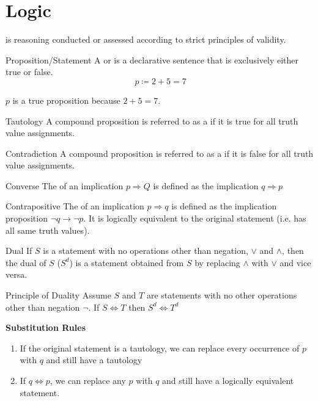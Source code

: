 \documentclass[12pt]{report}
\begin{document}
\newpage
\chapter{Logic}
 is reasoning conducted or assessed according to strict principles of validity.

\begin{dfnbox}{Proposition/Statement}
	A  or  is a declarative sentence that is exclusively either true or false.
	$$\ p \coloneq 2+5=7 $$
	
	$p$ is a true proposition because $2+5=7$.
\end{dfnbox}

\begin{dfnbox}{Tautology}
	A compound proposition is referred to as a  if it is true for all truth value assignments.
\end{dfnbox}

\begin{dfnbox}{Contradiction}
	A compound proposition is referred to as a  if it is false for all truth value assignments.
\end{dfnbox}

\begin{dfnbox}{Converse}
	The  of an implication $p \Rightarrow Q$ is defined as the implication $q \Rightarrow p$
\end{dfnbox}

\begin{dfnbox}{Contrapositive}
	The  of an implication $p \Rightarrow q$ is defined as the implication proposition $\neg q \rightarrow \neg p$. It is logically equivalent to the original statement (i.e. has all same truth values).
\end{dfnbox}	

\begin{dfnbox}{Dual}
	If $S$ is a statement with no operations other than negation, $\lor$ and $\land$, then the dual of $S$ ($S^d$) is a statement obtained from $S$ by replacing $\land$ with $\lor$ and vice versa.
\end{dfnbox}

\begin{thmbox}{Principle of Duality}
	Assume $S$ and $T$ are statements with no other operations other than negation $\neg$. If $S \iff T$ then $S^d \iff T^d$
	
	\textbf{Substitution Rules}
	\begin{enumerate}
		\item If the original statement is a tautology, we can replace every occurrence of $p$ with $q$ and still have a tautology
		\item If $q \iff p$, we can replace any $p$ with $q$ and still have a logically equivalent statement.
	\end{enumerate}
\end{thmbox}
\end{document}
